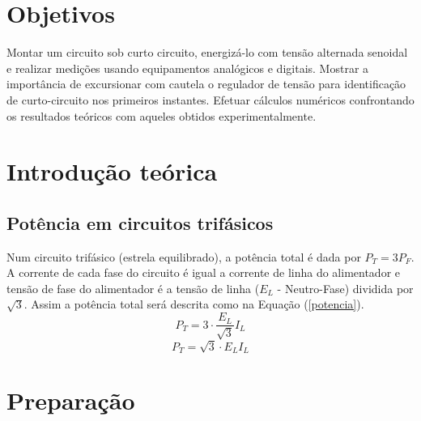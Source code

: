 \documentclass[a4paper,12pt,oneside,openany,table,xcdraw]{article}
\begin{document}
\newcommand{\thedepartment}{Faculdade de Engenharia Elétrica}
\newcommand{\thecourse}{FEELT}
\newcommand{\thetitle}{TENSÃO E CORRENTE DE CURTO-CIRCUITO EM REGULADOR DE TENSÃO SENOIDAL}
\newcommand{\thetype}{Relatório da Disciplina de Circuitos Elétricos II}
\newcommand{\theproftitle}{Bacharel em Engenharia Elétrica}
\newcommand{\thestudent}{Lesly Viviane Montúfar Berrios\\
\centering11811ETE001}
\newcommand{\theadvisor}{Prof. Wellington Maycon Santos Bernardes}
\newcommand{\thecity}{Uberlândia}

\thispagestyle{empty}


\onehalfspacing
\tableofcontents %
\newpage

\section{Objetivos} %
Montar um circuito sob curto circuito, energizá-lo com tensão alternada senoidal e realizar medições usando equipamentos analógicos e digitais. Mostrar a importância de excursionar com cautela o regulador de tensão para identificação de curto-circuito nos primeiros instantes. Efetuar cálculos numéricos confrontando os resultados teóricos com aqueles obtidos experimentalmente.

\section{Introdução teórica} %
\subsection{Potência em circuitos trifásicos}
Num circuito trifásico (estrela equilibrado), a potência total é dada por $P_{T}=3P_{F}$. A corrente de cada fase do circuito é igual a corrente de linha do alimentador e tensão de fase do alimentador é a tensão de linha ($E_{L}$ - Neutro-Fase) dividida por $\sqrt{3}$. Assim a potência total será descrita como na Equação (\ref{potencia})\cite{irwin}.
\begin{equation*}
P_{T}=3\cdot \dfrac{E_{L}}{\sqrt{3}} I_{L}
\end{equation*}
\begin{equation}\label{potencia}
P_{T}=\sqrt{3}\cdot E_{L} I_{L}
\end{equation}

\section{Preparação}
\end{document}
